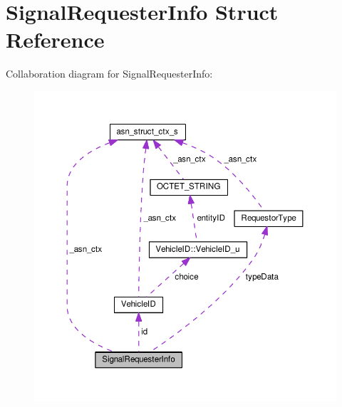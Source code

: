 \hypertarget{structSignalRequesterInfo}{}\section{Signal\+Requester\+Info Struct Reference}
\label{structSignalRequesterInfo}


Collaboration diagram for Signal\+Requester\+Info\+:\nopagebreak
\begin{figure}[H]
\begin{center}
\leavevmode
\includegraphics[width=350pt]{structSignalRequesterInfo__coll__graph}
\end{center}
\end{figure}
